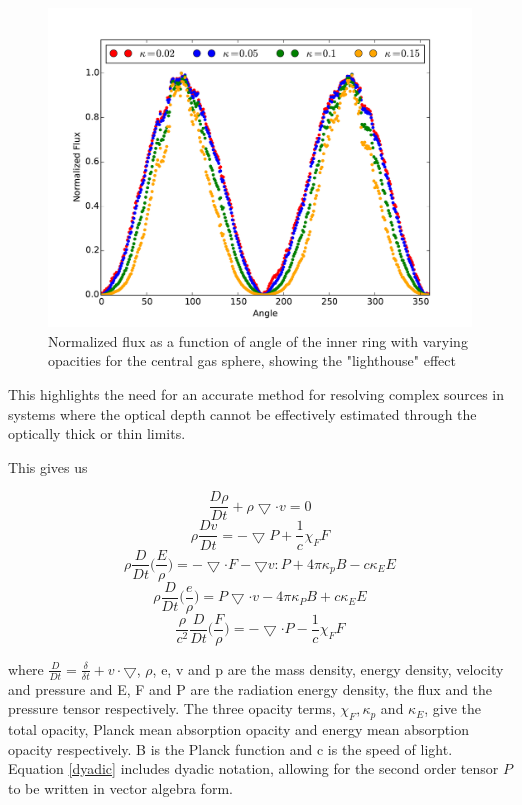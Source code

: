 \begin{figure} [H]
    \centering
    \includegraphics[width=\textwidth]{plots/CH4/csLighthouseNormalized.pdf}
    \caption{Normalized flux as a function of angle of the inner ring with varying opacities for the central gas sphere, showing the "lighthouse" effect}
    \label{fig:complexSourceLighthouseNormalized}
\end{figure}

This highlights the need for an accurate method for resolving complex sources in systems where the optical depth cannot be effectively estimated through the optically thick or thin limits.
\fi


This gives us

\begin{equation}
    \frac{D\rho}{Dt} + \rho \bigtriangledown \cdot v = 0
\end{equation}
\begin{equation}
    \rho \frac{Dv}{Dt} = -\bigtriangledown P + \frac{1}{c} \chi_F F
\end{equation}
\begin{equation}
    \rho \frac{D}{Dt} \bigg( \frac{E}{\rho} \bigg) = -\bigtriangledown \cdot F - \bigtriangledown v : P + 4\pi \kappa_p B -  c \kappa_E E
    \label{dyadic}
\end{equation}
\begin{equation}
    \rho \frac{D}{Dt} \bigg( \frac{e}{\rho} \bigg) = P \bigtriangledown \cdot v - 4 \pi \kappa_P B + c\kappa_E E
\end{equation}
\begin{equation}
        \frac{\rho}{c^2} \frac{D}{Dt} \bigg( \frac{F}{\rho} \bigg) = - \bigtriangledown \cdot P - \frac{1}{c} \chi_F F
\end{equation}

where $\frac{D}{Dt} = \frac{\delta}{\delta t} + v \cdot \bigtriangledown$, $\rho$, e, v and p are the mass density, energy density, velocity and pressure and E, F and P are the radiation energy density, the flux and the pressure tensor respectively. The three opacity terms, $\chi_F, \kappa_p$ and $\kappa_E$, give the total opacity, Planck mean absorption opacity and energy mean absorption opacity respectively. B is the Planck function and c is the speed of light. Equation \ref{dyadic} includes dyadic notation, allowing for the second order tensor $P$ to be written in vector algebra form.
